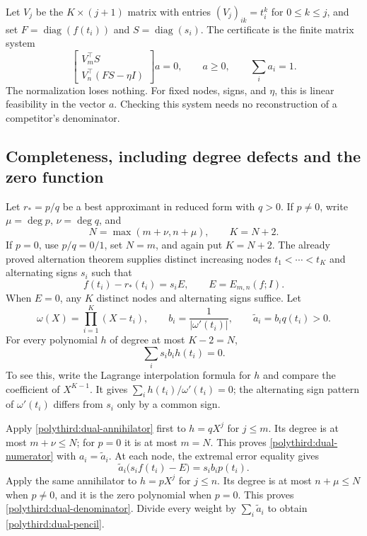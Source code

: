 \documentclass[11pt]{article}
\newcommand{\diag}{\operatorname{diag}}
\theoremstyle{remark}
\numberwithin{equation}{section}
\begin{document}
Let $V_j$ be the $K\times(j+1)$ matrix with entries
$(V_j)_{ik}=t_i^k$ for $0\le k\le j$, and set
$F=\diag(f(t_i))$ and $S=\diag(s_i)$.  The certificate is the finite
matrix system
\begin{equation}\label{polythird:dual-pencil}
 \begin{bmatrix}V_m^\top S\\ V_n^\top(FS-\eta I)\end{bmatrix}a=0,
 \qquad a\ge0,\qquad \sum_i a_i=1.
\end{equation}
The normalization loses nothing.  For fixed nodes, signs, and $\eta$,
this is linear feasibility in the vector $a$.  Checking this system
needs no reconstruction of a competitor's denominator.

\subsection{Completeness, including degree defects and the zero function}
Let $r_*=p/q$ be a best approximant in reduced form with $q>0$.
If $p\ne0$, write $\mu=\deg p$, $\nu=\deg q$, and
\[
 N=\max(m+\nu,n+\mu),\qquad K=N+2.
\]
If $p=0$, use $p/q=0/1$, set $N=m$, and again put $K=N+2$.
The already proved alternation theorem supplies distinct increasing
nodes $t_1<\cdots<t_K$ and alternating signs $s_i$ such that
\[
 f(t_i)-r_*(t_i)=s_i E,
 \qquad E=E_{m,n}(f;I).
\]
When $E=0$, any $K$ distinct nodes and alternating signs suffice.
Let
\[
 \omega(X)=\prod_{i=1}^K(X-t_i),\qquad
 b_i=\frac1{|\omega'(t_i)|},\qquad
 \widetilde a_i=b_iq(t_i)>0.
\]
For every polynomial $h$ of degree at most $K-2=N$,
\begin{equation}\label{polythird:dual-annihilator}
 \sum_i s_i b_i h(t_i)=0.
\end{equation}
To see this, write the Lagrange interpolation formula for $h$ and
compare the coefficient of $X^{K-1}$.  It gives
$\sum_i h(t_i)/\omega'(t_i)=0$; the alternating sign pattern of
$\omega'(t_i)$ differs from $s_i$ only by a common sign.

Apply \eqref{polythird:dual-annihilator} first to $h=qX^j$ for
$j\le m$.  Its degree is at most $m+\nu\le N$; for $p=0$ it is
at most $m=N$.  This proves \eqref{polythird:dual-numerator} with
$a_i=\widetilde a_i$.  At each node, the extremal error equality gives
\[
 \widetilde a_i\bigl(s_i f(t_i)-E\bigr)=s_i b_i p(t_i).
\]
Apply the same annihilator to $h=pX^j$ for $j\le n$.
Its degree is at most $n+\mu\le N$ when $p\ne0$, and it is the
zero polynomial when $p=0$.  This proves
\eqref{polythird:dual-denominator}.  Divide every weight by
$\sum_i\widetilde a_i$ to obtain \eqref{polythird:dual-pencil}.
\end{document}
